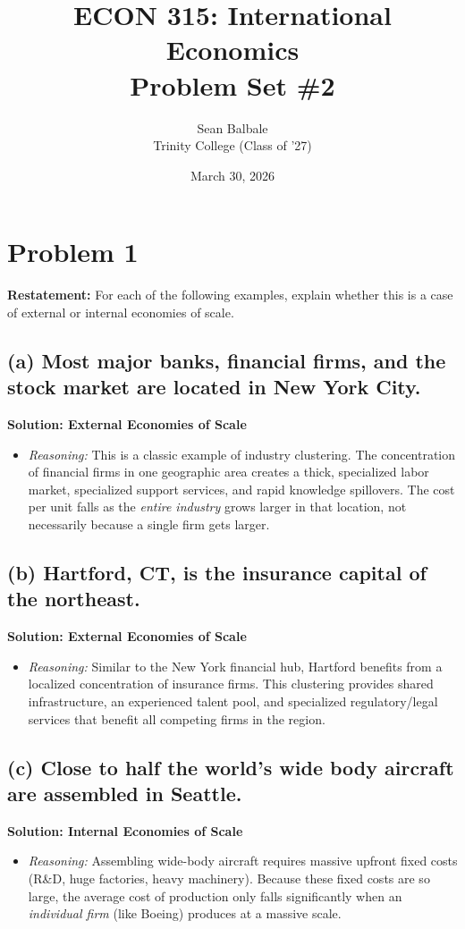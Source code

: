 \documentclass[11pt, letterpaper]{article}
\title{\textbf{ECON 315: International Economics \\ Problem Set \#2}}
\author{Sean Balbale \\ Trinity College (Class of '27)}
\date{March 30, 2026}
\begin{document}
\maketitle

\section*{Problem 1}

\textbf{Restatement:} For each of the following examples, explain whether this is a case of external or internal economies of scale.

\subsection*{(a) Most major banks, financial firms, and the stock market are located in New York City.}
\noindent \textbf{Solution: External Economies of Scale}
\begin{itemize}
  \item \textit{Reasoning:} This is a classic example of industry clustering. The concentration of financial firms in one geographic area creates a thick, specialized labor market, specialized support services, and rapid knowledge spillovers. The cost per unit falls as the \textit{entire industry} grows larger in that location, not necessarily because a single firm gets larger.
\end{itemize}

\subsection*{(b) Hartford, CT, is the insurance capital of the northeast.}
\noindent \textbf{Solution: External Economies of Scale}
\begin{itemize}
  \item \textit{Reasoning:} Similar to the New York financial hub, Hartford benefits from a localized concentration of insurance firms. This clustering provides shared infrastructure, an experienced talent pool, and specialized regulatory/legal services that benefit all competing firms in the region.
\end{itemize}

\subsection*{(c) Close to half the world's wide body aircraft are assembled in Seattle.}
\noindent \textbf{Solution: Internal Economies of Scale}
\begin{itemize}
  \item \textit{Reasoning:} Assembling wide-body aircraft requires massive upfront fixed costs (R\&D, huge factories, heavy machinery). Because these fixed costs are so large, the average cost of production only falls significantly when an \textit{individual firm} (like Boeing) produces at a massive scale.
\end{itemize}
\end{document}
